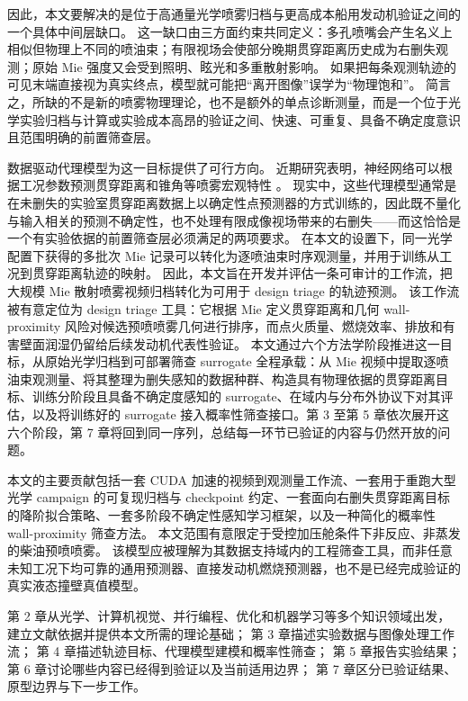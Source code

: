 因此，本文要解决的是位于高通量光学喷雾归档与更高成本船用发动机验证之间的一个具体中间层缺口。
这一缺口由三方面约束共同定义：多孔喷嘴会产生名义上相似但物理上不同的喷油束；有限视场会使部分晚期贯穿距离历史成为右删失观测；原始 Mie 强度又会受到照明、眩光和多重散射影响。
如果把每条观测轨迹的可见末端直接视为真实终点，模型就可能把“离开图像”误学为“物理饱和”。
简言之，所缺的不是新的喷雾物理理论，也不是额外的单点诊断测量，而是一个位于光学实验归档与计算或实验成本高昂的验证之间、快速、可重复、具备不确定度意识且范围明确的前置筛查层。

数据驱动代理模型为这一目标提供了可行方向。
近期研究表明，神经网络可以根据工况参数预测贯穿距离和锥角等喷雾宏观特性
\cite{VazKarathanasis2026,liu2020sprayreview}。
现实中，这些代理模型通常是在未删失的实验室贯穿距离数据上以确定性点预测器的方式训练的，因此既不量化与输入相关的预测不确定性，也不处理有限成像视场带来的右删失——而这恰恰是一个有实验依据的前置筛查层必须满足的两项要求。
在本文的设置下，同一光学配置下获得的多批次 Mie 记录可以转化为逐喷油束时序观测量，并用于训练从工况到贯穿距离轨迹的映射。
因此，本文旨在开发并评估一条可审计的工作流，把大规模 Mie 散射喷雾视频归档转化为可用于 design triage 的轨迹预测。
该工作流被有意定位为 design triage 工具：它根据 Mie 定义贯穿距离和几何 wall-proximity 风险对候选预喷喷雾几何进行排序，而点火质量、燃烧效率、排放和有害壁面润湿仍留给后续发动机代表性验证。
本文通过六个方法学阶段推进这一目标，从原始光学归档到可部署筛查 surrogate 全程承载：从 Mie 视频中提取逐喷油束观测量、将其整理为删失感知的数据种群、构造具有物理依据的贯穿距离目标、训练分阶段且具备不确定度感知的 surrogate、在域内与分布外协议下对其评估，以及将训练好的 surrogate 接入概率性筛查接口。第 3 至第 5 章依次展开这六个阶段，第 7 章将回到同一序列，总结每一环节已验证的内容与仍然开放的问题。

本文的主要贡献包括一套 CUDA 加速的视频到观测量工作流、一套用于重跑大型光学 campaign 的可复现归档与 checkpoint 约定、一套面向右删失贯穿距离目标的降阶拟合策略、一套多阶段不确定性感知学习框架，以及一种简化的概率性 wall-proximity 筛查方法。
本文范围有意限定于受控加压舱条件下非反应、非蒸发的柴油预喷喷雾。
该模型应被理解为其数据支持域内的工程筛查工具，而非任意未知工况下均可靠的通用预测器、直接发动机燃烧预测器，也不是已经完成验证的真实液态撞壁真值模型。

第 2 章从光学、计算机视觉、并行编程、优化和机器学习等多个知识领域出发，建立文献依据并提供本文所需的理论基础；
第 3 章描述实验数据与图像处理工作流；
第 4 章描述轨迹目标、代理模型建模和概率性筛查；
第 5 章报告实验结果；
第 6 章讨论哪些内容已经得到验证以及当前适用边界；
第 7 章区分已验证结果、原型边界与下一步工作。
